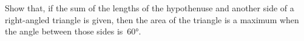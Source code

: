 Show that, if the sum of the lengths of the hypothenuse and another
side of a right-angled triangle is given, then the area of the triangle is a
maximum when the angle between those sides is~$60°$. 

